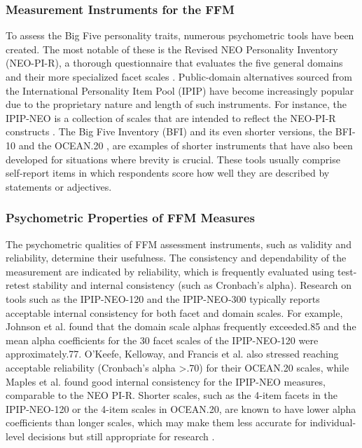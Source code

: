 \documentclass{DESSThesis}
\begin{document}
\subsubsection{Measurement Instruments for the FFM}
To assess the Big Five personality traits, numerous psychometric tools have been created. The most notable of these is the Revised NEO Personality Inventory (NEO-PI-R), a thorough questionnaire that evaluates the five general domains and their more specialized facet scales \cite{maples_test_2014,mccrae_reinterpreting_1989}. Public-domain alternatives sourced from the International Personality Item Pool (IPIP) have become increasingly popular due to the proprietary nature and length of such instruments. For instance, the IPIP-NEO is a collection of scales that are intended to reflect the NEO-PI-R constructs \cite{johnson_measuring_2014,maples_test_2014}. The Big Five Inventory (BFI) and its even shorter versions, the BFI-10 \cite{rammstedt_big_2014} and the OCEAN.20 \cite{okeefe_introducing_2012}, are examples of shorter instruments that have also been developed for situations where brevity is crucial. These tools usually comprise self-report items in which respondents score how well they are described by statements or adjectives.

\subsubsection{Psychometric Properties of FFM Measures}
The psychometric qualities of FFM assessment instruments, such as validity and reliability, determine their usefulness. The consistency and dependability of the measurement are indicated by reliability, which is frequently evaluated using test-retest stability and internal consistency (such as Cronbach's alpha). Research on tools such as the IPIP-NEO-120 \cite{johnson_measuring_2014,kajonius_assessing_2019} and the IPIP-NEO-300 \cite{maples_test_2014} typically reports acceptable internal consistency for both facet and domain scales. For example, Johnson et al. found that the domain scale alphas frequently exceeded.85 and the mean alpha coefficients for the 30 facet scales of the IPIP-NEO-120 were approximately.77. O'Keefe, Kelloway, and Francis et al. also stressed reaching acceptable reliability (Cronbach's alpha >.70) for their OCEAN.20 scales, while Maples et al. found good internal consistency for the IPIP-NEO measures, comparable to the NEO PI-R. Shorter scales, such as the 4-item facets in the IPIP-NEO-120 or the 4-item scales in OCEAN.20, are known to have lower alpha coefficients than longer scales, which may make them less accurate for individual-level decisions but still appropriate for research \cite{johnson_measuring_2014,okeefe_introducing_2012}.
\end{document}
